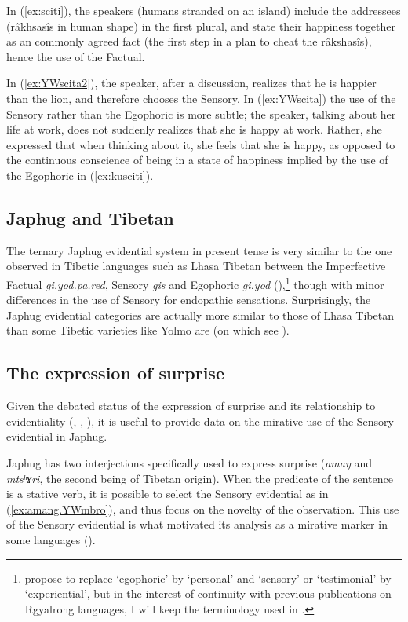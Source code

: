 \documentclass[oldfontcommands,oneside,a4paper,11pt]{article}
\newcommand{\ipa}[1]{{\phon\textit{#1}}} %
\newcommand{\refb}[1]{(\ref{#1})}
\begin{document}
In \refb{ex:sciti}, the speakers (humans stranded on an island) include the addressees (râkhsasîs in human shape) in the first plural, and state their happiness together as an commonly agreed fact (the first step in a plan to cheat the râkshasîs), hence the use of the Factual. 

In \refb{ex:YWscita2}, the speaker, after a discussion, realizes that he is happier than the lion, and therefore chooses the Sensory. In \refb{ex:YWscita} the use of the Sensory rather than the Egophoric is more subtle; the speaker, talking about her life at work, does not suddenly realizes that she is happy at work. Rather, she expressed that when thinking about it, she feels that she is happy, as opposed to the continuous conscience of being in a state of happiness implied by the use of the Egophoric in \refb{ex:kusciti}.

\subsection{Japhug and Tibetan}
The ternary Japhug evidential system in present tense is very similar to the one observed in Tibetic languages such as Lhasa Tibetan between the Imperfective Factual \ipa{gi.yod.pa.red}, Sensory \textit{gis} and Egophoric \ipa{gi.yod} (\citealt[295+]{tournadre08conjunct}),\footnote{\citet{hill17evidential} propose to replace `egophoric' by ‘personal’ and `sensory' or `testimonial' by ‘experiential’, but in the interest of continuity with previous publications on Rgyalrong languages, I will keep the terminology used in \citet{jacques17sketch}. } though with minor differences in the use of Sensory for endopathic sensations. Surprisingly, the Japhug evidential categories are actually more similar to those of Lhasa Tibetan than some Tibetic varieties like Yolmo are (on which see \citealt{gawne13copulas}). 
 
\subsection{The expression of surprise}
Given the debated status of the expression of surprise and its relationship to evidentiality (\citealt{hill12mirativity}, \citealt{delancey12still}, \citealt{aikhenvald12mirativity}), it is useful to provide data on the mirative use of the Sensory evidential in Japhug. 

Japhug has two interjections specifically used to express surprise (\ipa{amaŋ} and \ipa{mtsʰɤri}, the second being of Tibetan origin). When the predicate of the sentence is a stative verb, it is possible to select the Sensory evidential as in \refb{ex:amang.YWmbro}, and thus focus on the novelty of the observation. This use of the Sensory evidential is what motivated its analysis as a mirative marker in some languages (\citealt{hill12mirativity}).
\end{document}
